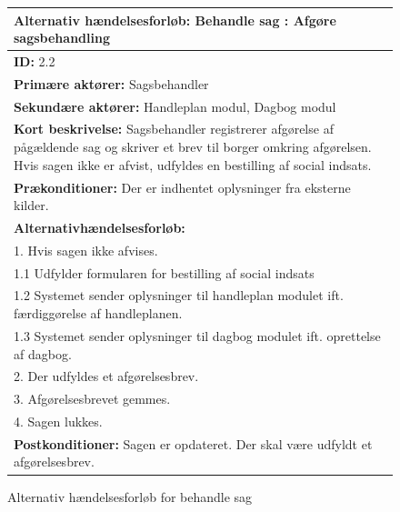 \begin{figure} [htb!]
\begin{longtable}{|p{18cm}|}
\hline
\textbf{Alternativ hændelsesforløb:} Behandle sag : Afgøre sagsbehandling \\
\hline
\textbf{ID:} 2.2 \\
\hline
\textbf{Primære aktører:} Sagsbehandler\\
\hline
\textbf{Sekundære aktører:} Handleplan modul, Dagbog modul \\
\hline
\textbf{Kort beskrivelse: }Sagsbehandler registrerer afgørelse af pågældende sag og skriver et brev til borger omkring afgørelsen. Hvis sagen ikke er afvist, udfyldes en bestilling af social indsats.\\
\hline
\textbf{Prækonditioner: }Der er indhentet oplysninger fra eksterne kilder. 
\\
\hline
\textbf{Alternativhændelsesforløb:}\\
1. Hvis sagen ikke afvises.\\
1.1 Udfylder formularen for bestilling af social indsats\\
1.2 Systemet sender oplysninger til handleplan modulet ift. færdiggørelse af handleplanen.\\
1.3 Systemet sender oplysninger til dagbog modulet ift.  oprettelse af dagbog.\\
2. Der udfyldes et afgørelsesbrev. \\
3. Afgørelsesbrevet gemmes.\\
4. Sagen lukkes.
\\
\hline
\textbf{Postkonditioner:} Sagen er opdateret. Der skal være udfyldt et afgørelsesbrev.  \\
\hline
\end{longtable}
\caption{Alternativ hændelsesforløb for behandle sag}
\label{tab:2.2}
\end{figure}

